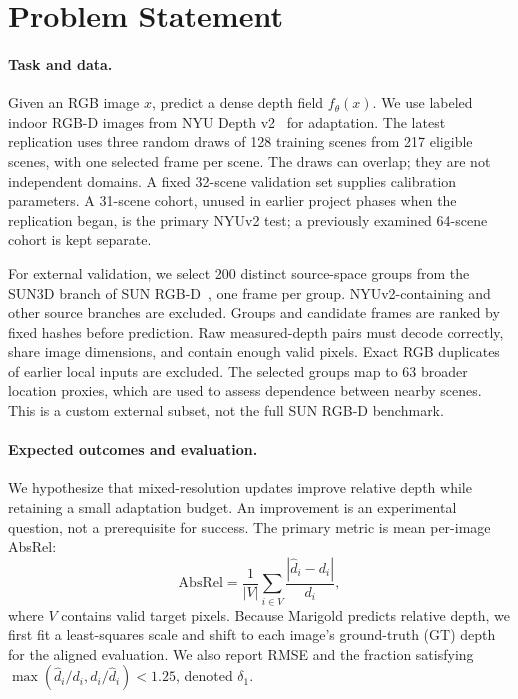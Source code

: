 \section{Problem Statement}
\paragraph{Task and data.}
Given an RGB image $x$, predict a dense depth field $f_\theta(x)$. We use labeled indoor RGB-D images from NYU Depth v2~\cite{nyu} for adaptation. The latest replication uses three random draws of 128 training scenes from 217 eligible scenes, with one selected frame per scene. The draws can overlap; they are not independent domains. A fixed 32-scene validation set supplies calibration parameters. A 31-scene cohort, unused in earlier project phases when the replication began, is the primary NYUv2 test; a previously examined 64-scene cohort is kept separate.

For external validation, we select 200 distinct source-space groups from the SUN3D branch of SUN RGB-D~\cite{sunrgbd,sun3d}, one frame per group. NYUv2-containing and other source branches are excluded. Groups and candidate frames are ranked by fixed hashes before prediction. Raw measured-depth pairs must decode correctly, share image dimensions, and contain enough valid pixels. Exact RGB duplicates of earlier local inputs are excluded. The selected groups map to 63 broader location proxies, which are used to assess dependence between nearby scenes. This is a custom external subset, not the full SUN RGB-D benchmark.

\paragraph{Expected outcomes and evaluation.}
We hypothesize that mixed-resolution updates improve relative depth while retaining a small adaptation budget. An improvement is an experimental question, not a prerequisite for success. The primary metric is mean per-image AbsRel:
\begin{equation}
\mathrm{AbsRel}=\frac{1}{|V|}\sum_{i\in V}\frac{|\hat d_i-d_i|}{d_i},
\end{equation}
where $V$ contains valid target pixels. Because Marigold predicts relative depth, we first fit a least-squares scale and shift to each image's ground-truth (GT) depth for the aligned evaluation. We also report RMSE and the fraction satisfying $\max(\hat d_i/d_i,d_i/\hat d_i)<1.25$, denoted $\delta_1$.


